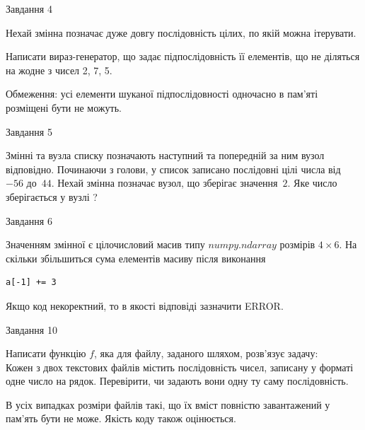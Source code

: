 \documentclass[12pt, ukrainian]{article}
\begin{document}
{               
{\begin{center}Завдання {4}\end{center}}
\vspace{-6mm}
Нехай змінна  позначає дуже довгу послідовність цілих, по якій можна ітерувати.

Написати вираз-генератор, що задає підпослідовність її елементів, що не діляться на жодне з чисел 2, 7, 5.

Обмеження: усі елементи шуканої підпослідовності одночасно в пам'яті розміщені бути не можуть.\par

\vspace{10mm}
               
{\begin{center}Завдання {5}\end{center}}
\vspace{-6mm}
Змінні  та  вузла списку позначають наступний та попередній за ним вузол відповідно. Починаючи з голови, у список записано послідовні цілі числа від~$-56$ до~$44$. Нехай змінна  позначає вузол, що зберігає значення~$2$.
Яке число зберігається у вузлі  ?\par

               
{\begin{center}Завдання {6}\end{center}}
\vspace{-6mm}
Значенням змінної  є цілочисловий масив типу $numpy.ndarray$ розмірів $4{\times}6$. На скільки збільшиться сума елементів масиву  після виконання
\begin{verbatim}
a[-1] += 3
\end{verbatim}


Якщо код некоректний, то в якості відповіді зазначити ERROR.\par

               
{\begin{center}Завдання {10}\end{center}}
\vspace{-6mm}

Написати функцію $f$, яка для файлу, заданого шляхом, розв’язує задачу:\\ Кожен з двох текстових файлів містить послідовність чисел, записану у форматі одне число на рядок.  Перевірити, чи задають вони одну ту саму послідовність.

В усіх випадках розміри файлів такі, що їх вміст повністю завантажений у пам'ять бути не може. Якість коду також оцінюється.



}
\end{document}
